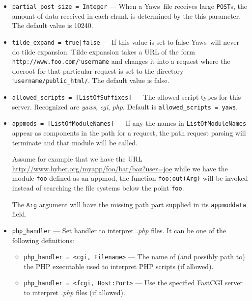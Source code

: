 \documentclass[11pt,oneside,english]{book}
\newcommand{\Yaws}            %
        {{\sc Yaws}}
\begin{document}
\begin{itemize}
\item       \verb+partial_post_size = Integer+ ---
              When a \Yaws\  file receives large  \verb+POST+s,  the
              amount  of  data  received  in each chunk is
              determined by the this parameter.  The default
              value is 10240.

\item       \verb+tilde_expand = true|false+ ---
              If  this  value  is  set  to false \Yaws\  will
              never do tilde  expansion.  Tilde expansion takes a URL
              of the form
              \verb+http://www.foo.com/+\char`\~\verb+username+ and
              changes it into a request where the docroot for that
              particular request is set to the directory
              \char`\~\verb+username/public_html/+. The default value
              is false.

\item       \verb+allowed_scripts = [ListOfSuffixes]+ ---
              The allowed script types for this server.  Recognized
              are \textit{yaws}, \textit{cgi}, \textit{php}.  Default
              is \verb+allowed_scripts = yaws+.

\item       \verb+appmods = [ListOfModuleNames]+ ---
              If any the names in \verb+ListOfModuleNames+ appear
              as components in the path for a request, the
              path request parsing will terminate and that
              module will be called.

              Assume  for  example  that  we  have  the  URL
              \url{http://www.hyber.org/myapp/foo/bar/baz?user=joe}
              while we have the module \verb+foo+ defined  as  an
              appmod,  the  function  \verb+foo:out(Arg)+ will be
              invoked instead of searching the file systems
              below the point \verb+foo+.

              The \verb+Arg+ argument will have the missing path
              part supplied in its \verb+appmoddata+ field.

\item       \verb+php_handler+ ---
              Set handler to interpret \textit{.php} files. It can be
              one of the following definitions:

              \begin{itemize}
              \item \verb+php_handler = <cgi, Filename>+ --- The name
                of (and possibly path to) the PHP executable used to
                interpret PHP scripts (if allowed).
              \item \verb+php_handler = <fcgi, Host:Port>+ --- Use the
                specified FastCGI server to interpret \textit{.php}
                files (if allowed).


\end{itemize}
\end{itemize}
\end{document}
